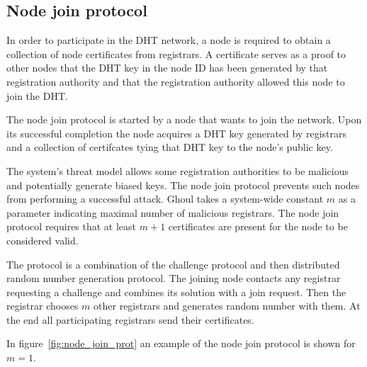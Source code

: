 \subsection{Node join protocol}

In order to participate in the DHT network, a node is required to obtain a
collection of node certificates from registrars. A certificate serves as a proof
to other nodes that the DHT key in the node ID has been generated by that
registration authority and that the registration authority allowed this node to
join the DHT.

The node join protocol is started by a node that wants to join the network.
Upon its successful completion the node acquires a DHT key generated by
registrars and a collection of certifcates tying that DHT key to the node's
public key.

The system's threat model allows some registration authorities to be malicious
and potentially generate biased keys. The node join protocol prevents such nodes
from performing a successful attack. Ghoul takes a system-wide constant $m$ as a
parameter indicating maximal number of malicious registrars. The node join
protocol requires that at least $m+1$ certificates are present for the node to
be considered valid.

The protocol is a combination of the challenge protocol and then distributed
random number generation protocol. The joining node contacts any registrar
requesting a challenge and combines its solution with a join request. Then the
registrar chooses $m$ other registrars and generates random number with them. At
the end all participating registrars send their certificates.

In figure~\ref{fig:node_join_prot} an example of the node join protocol is shown
for $m=1$.

